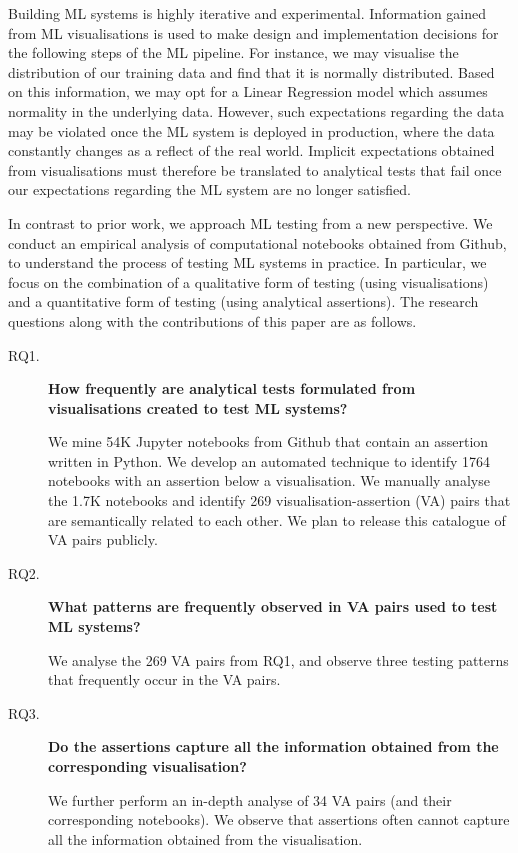 \documentclass[conference]{IEEEtran}
\begin{document}
Building ML systems is highly iterative and experimental. Information gained from ML visualisations is used to make design and implementation decisions for the following steps of the ML pipeline. For instance, we may visualise the distribution of our training data and find that it is normally distributed. Based on this information, we may opt for a Linear Regression model which assumes normality in the underlying data. However, such expectations regarding the data may be violated once the ML system is deployed in production, where the data constantly changes as a reflect of the real world. Implicit expectations obtained from visualisations must therefore be translated to analytical tests that fail once our expectations regarding the ML system are no longer satisfied.

In contrast to prior work, we approach ML testing from a new perspective. We conduct an empirical analysis of computational notebooks obtained from Github, to understand the process of testing ML systems in practice. In particular, we focus on the combination of a qualitative form of testing (using visualisations) and a quantitative form of testing (using analytical assertions). The research questions along with the contributions of this paper are as follows.

\begin{description}
  \item[RQ1.] \textbf{How frequently are analytical tests formulated from visualisations created to test ML systems?}

We mine 54K Jupyter notebooks from Github that contain an assertion written in Python. We develop an automated technique to identify 1764 notebooks with an assertion below a visualisation. We manually analyse the 1.7K notebooks and identify 269 visualisation-assertion (VA) pairs that are semantically related to each other. We plan to release this catalogue of VA pairs publicly.

\item[RQ2.] \textbf{What patterns are frequently observed in VA pairs used to test ML systems?}

We analyse the 269 VA pairs from RQ1, and observe three testing patterns that frequently occur in the VA pairs.

\item[RQ3.] \textbf{Do the assertions capture all the information obtained from the corresponding visualisation?}

We further perform an in-depth analyse of 34 VA pairs (and their corresponding notebooks). We observe that assertions often cannot capture all the information obtained from the visualisation.

\end{description}
\end{document}
